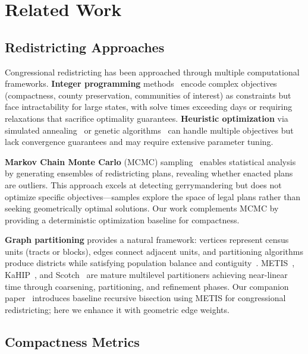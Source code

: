 \section{Related Work}

\subsection{Redistricting Approaches}

Congressional redistricting has been approached through multiple computational frameworks. \textbf{Integer programming} methods~\cite{garfinkel1970optimal,mehrotra1998optimal} encode complex objectives (compactness, county preservation, communities of interest) as constraints but face intractability for large states, with solve times exceeding days or requiring relaxations that sacrifice optimality guarantees. \textbf{Heuristic optimization} via simulated annealing~\cite{bozkaya2003zone} or genetic algorithms~\cite{bacao2005applying} can handle multiple objectives but lack convergence guarantees and may require extensive parameter tuning.

\textbf{Markov Chain Monte Carlo} (MCMC) sampling~\cite{duchin2018outlier,fifield2020automated} enables statistical analysis by generating ensembles of redistricting plans, revealing whether enacted plans are outliers. This approach excels at detecting gerrymandering but does not optimize specific objectives—samples explore the space of legal plans rather than seeking geometrically optimal solutions. Our work complements MCMC by providing a deterministic optimization baseline for compactness.

\textbf{Graph partitioning} provides a natural framework: vertices represent census units (tracts or blocks), edges connect adjacent units, and partitioning algorithms produce districts while satisfying population balance and contiguity~\cite{ricca2008local}. METIS~\cite{karypis1998metis}, KaHIP~\cite{sanders2013think}, and Scotch~\cite{pellegrini2008scotch} are mature multilevel partitioners achieving near-linear time through coarsening, partitioning, and refinement phases. Our companion paper~\cite{dellaLibera2026recursive} introduces baseline recursive bisection using METIS for congressional redistricting; here we enhance it with geometric edge weights.

\subsection{Compactness Metrics}

